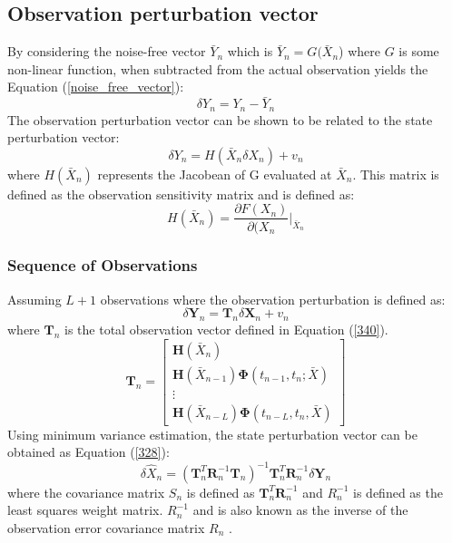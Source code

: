 \subsection{Observation perturbation vector}
By considering the noise-free vector \(\bar{Y}_n\) which is \(\bar{Y}_n = G(\bar{X}_n\)) where \(G\) is some non-linear function, when subtracted from the actual observation yields the Equation (\ref{noise_free_vector}): 
\begin{equation}
    \delta Y_n = Y_n-\bar{Y}_n
    \label{noise_free_vector}
\end{equation}
The observation perturbation vector can be shown to be related to the state perturbation vector:
\begin{equation}
    \delta Y_n = H(\bar{X}_n\delta X_n) +v_n
\end{equation}
where \(H(\bar{X}_n)\) represents the Jacobean of G evaluated at \(\bar{X}_n\). This matrix is defined as the observation sensitivity matrix and is defined as:
\begin{equation}
    H(\bar{X}_n) =  \frac{\partial F(X_n)}{\partial (X_n}|_{\bar{X}_n}
\end{equation}

\subsubsection{Sequence of Observations}
Assuming  \(L+1\) observations where the observation perturbation is defined as:
\begin{equation}
    \delta \mathbf{Y}_n = \mathbf{T}_n \delta \mathbf{X}_n + v_n 
    \label{326}
\end{equation}
where \(\mathbf{T}_n\) is the total observation vector defined in Equation (\ref{340}).
\begin{equation}
    \mathbf{T}_n = 
    \begin{bmatrix}
        \mathbf{H}(\bar{X}_n) \\
        \mathbf{H}(\bar{X}_{n-1}) \mathbf{\Phi}(t_{n-1},t_n;\bar{X}) \\
        \vdots \\
        \mathbf{H}(\bar{X}_{n-L}) \mathbf{\Phi}(t_{n-L},t_n,\bar{X})
    \end{bmatrix}
    \label{340}
\end{equation}
Using minimum variance estimation, the state perturbation vector can be obtained as Equation (\ref{328}):
\begin{equation}
    \delta \hat{X}_n = (\mathbf{T}^T_n \mathbf{R}_n^{-1} \mathbf{T}_n)^{-1}\mathbf{T}^T_n \mathbf{R}_n^{-1} \delta \mathbf{Y}_n
    \label{328}
\end{equation}
where the covariance matrix \(S_n\) is defined as \(\mathbf{T}^T_n\mathbf{R}_n^{-1}\) and \(R^{-1}_n\) is defined as  the least squares weight matrix. \(R^{-1}_n\)  and is also known as the inverse of the observation error covariance matrix \(R_n\) \cite{Inggs1}.

